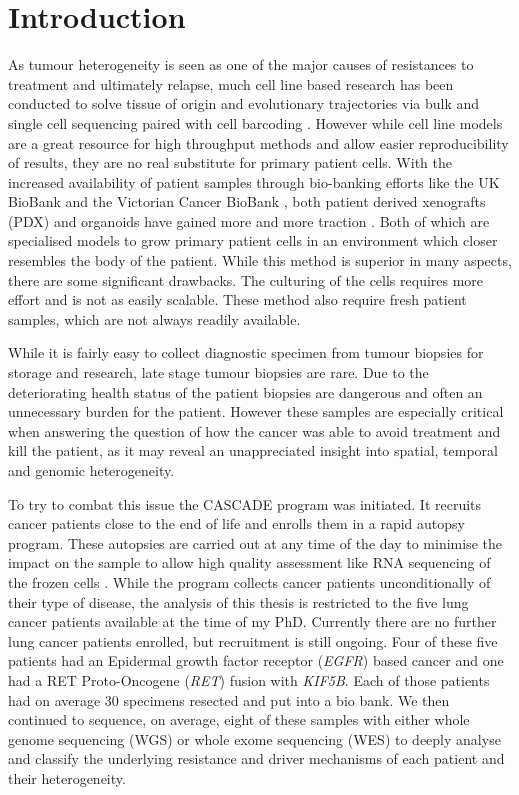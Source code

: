 \section{Introduction}
\label{cascade-sec:intro}

As tumour heterogeneity is seen as one of the major causes of resistances to treatment and ultimately relapse, much cell line based research has been conducted to solve tissue of origin and evolutionary trajectories via bulk and single cell sequencing paired with cell barcoding \cite{Fennell2021,Penter2022}. However while cell line models are a great resource for high throughput methods and allow easier reproducibility of results, they are no real substitute for primary patient cells. With the increased availability of patient samples through bio-banking efforts  like the UK BioBank \cite{Sudlow2015} and the Victorian Cancer BioBank \cite{CCV2006}, both patient derived xenografts (PDX) and organoids have gained more and more traction \cite{Yoshida2020}. Both of which are specialised models to grow primary patient cells in an environment which closer resembles the body of the patient. While this method is superior in many aspects, there are some significant drawbacks. The culturing of the cells requires more effort and is not as easily scalable. These method also require fresh patient samples, which are not always readily available.

While it is fairly easy to collect diagnostic specimen from tumour biopsies for storage and research, late stage tumour biopsies are rare. Due to the deteriorating health status of the patient biopsies are dangerous and often an unnecessary burden for the patient. However these samples are especially critical when answering the question of how the cancer was able to avoid treatment and kill the patient, as it may reveal an unappreciated insight into spatial, temporal and genomic heterogeneity.

To try to combat this issue the CASCADE program was initiated. It recruits cancer patients close to the end of life and enrolls them in a rapid autopsy program. These autopsies are carried out at any time of the day to minimise the impact on the sample to allow high quality assessment like RNA sequencing of the frozen cells \cite{Alsop2016}.
While the program collects cancer patients unconditionally of their type of disease, the analysis of this thesis is restricted to the five lung cancer patients available at the time of my PhD. Currently there are no further lung cancer patients enrolled, but recruitment is still ongoing. Four of these five patients had an Epidermal growth factor receptor (\textit{EGFR}) based cancer and one had a RET Proto-Oncogene (\textit{RET}) fusion with \textit{KIF5B}. Each of those patients had on average 30 specimens resected and put into a bio bank. We then continued to sequence, on average, eight of these samples with either whole genome sequencing (WGS) or whole exome sequencing (WES) to deeply analyse and classify the underlying resistance and driver mechanisms of each patient and their heterogeneity.

